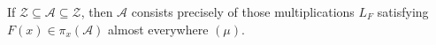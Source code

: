 If $\mathcal{Z} \subseteq \mathcal{A} \subseteq \mathcal{Z}$, then $\mathcal{A}$ consists precisely of those multiplications $L_F$ satisfying $F(x) \in \pi_x(\mathcal{A})$ almost everywhere $(\mu)$.
